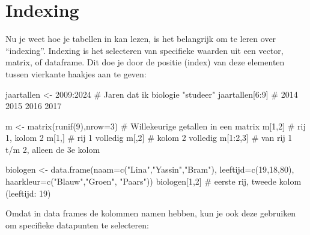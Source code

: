 \documentclass[
  a4paper,
]{scrbook}
\newenvironment{Shaded}{\begin{snugshade}}{\end{snugshade}}
\newcommand{\AttributeTok}[1]{\textcolor[rgb]{0.40,0.45,0.13}{#1}}
\newcommand{\CommentTok}[1]{\textcolor[rgb]{0.37,0.37,0.37}{#1}}
\newcommand{\DecValTok}[1]{\textcolor[rgb]{0.68,0.00,0.00}{#1}}
\newcommand{\FunctionTok}[1]{\textcolor[rgb]{0.28,0.35,0.67}{#1}}
\newcommand{\NormalTok}[1]{\textcolor[rgb]{0.00,0.23,0.31}{#1}}
\newcommand{\OtherTok}[1]{\textcolor[rgb]{0.00,0.23,0.31}{#1}}
\newcommand{\SpecialCharTok}[1]{\textcolor[rgb]{0.37,0.37,0.37}{#1}}
\newcommand{\StringTok}[1]{\textcolor[rgb]{0.13,0.47,0.30}{#1}}
\theoremstyle{definition}
\theoremstyle{remark}
\begin{document}
\hypertarget{indexing}{%
\section{Indexing}\label{indexing}}

Nu je weet hoe je tabellen in kan lezen, is het belangrijk om te leren
over ``indexing''. Indexing is het selecteren van specifieke waarden uit
een vector, matrix, of dataframe. Dit doe je door de positie (index) van
deze elementen tussen vierkante haakjes aan te geven:

\begin{Shaded}
\begin{Highlighting}[]
\NormalTok{jaartallen }\OtherTok{\textless{}{-}} \DecValTok{2009}\SpecialCharTok{:}\DecValTok{2024}         \CommentTok{\# Jaren dat ik biologie "studeer"}
\NormalTok{jaartallen[}\DecValTok{6}\SpecialCharTok{:}\DecValTok{9}\NormalTok{]                 }\CommentTok{\# 2014 2015 2016 2017}

\NormalTok{m }\OtherTok{\textless{}{-}} \FunctionTok{matrix}\NormalTok{(}\FunctionTok{runif}\NormalTok{(}\DecValTok{9}\NormalTok{),}\AttributeTok{nrow=}\DecValTok{3}\NormalTok{)    }\CommentTok{\# Willekeurige getallen in een matrix}
\NormalTok{m[}\DecValTok{1}\NormalTok{,}\DecValTok{2}\NormalTok{]    }\CommentTok{\# rij 1, kolom 2}
\NormalTok{m[}\DecValTok{1}\NormalTok{,]     }\CommentTok{\# rij 1 volledig}
\NormalTok{m[,}\DecValTok{2}\NormalTok{]     }\CommentTok{\# kolom 2 volledig}
\NormalTok{m[}\DecValTok{1}\SpecialCharTok{:}\DecValTok{2}\NormalTok{,}\DecValTok{3}\NormalTok{]  }\CommentTok{\# van rij 1 t/m 2, alleen de 3e kolom}

\NormalTok{biologen }\OtherTok{\textless{}{-}} \FunctionTok{data.frame}\NormalTok{(}\AttributeTok{naam=}\FunctionTok{c}\NormalTok{(}\StringTok{"Lina"}\NormalTok{,}\StringTok{"Yassin"}\NormalTok{,}\StringTok{"Bram"}\NormalTok{),}
                       \AttributeTok{leeftijd=}\FunctionTok{c}\NormalTok{(}\DecValTok{19}\NormalTok{,}\DecValTok{18}\NormalTok{,}\DecValTok{80}\NormalTok{), }
                       \AttributeTok{haarkleur=}\FunctionTok{c}\NormalTok{(}\StringTok{"Blauw"}\NormalTok{,}\StringTok{"Groen"}\NormalTok{, }\StringTok{"Paars"}\NormalTok{))}
\NormalTok{biologen[}\DecValTok{1}\NormalTok{,}\DecValTok{2}\NormalTok{] }\CommentTok{\# eerste rij, tweede kolom (leeftijd: 19)}
\end{Highlighting}
\end{Shaded}

Omdat in data frames de kolommen namen hebben, kun je ook deze gebruiken
om specifieke datapunten te selecteren:
\end{document}
